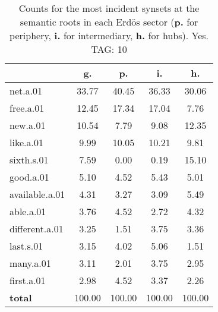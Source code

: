 \begin{table}[h!]
\begin{center}
\begin{tabular}{| l || c | c | c | c |}\hline
 & {\bf g.} & {\bf p.} & {\bf i.} & {\bf h.} \\\hline\hline
net.a.01 & 33.77  & 40.45  & 36.33  & 30.06 \\\hline
free.a.01 & 12.45  & 17.34  & 17.04  & 7.76 \\\hline
new.a.01 & 10.54  & 7.79  & 9.08  & 12.35 \\\hline
like.a.01 & 9.99  & 10.05  & 10.21  & 9.81 \\\hline
sixth.s.01 & 7.59  & 0.00  & 0.19  & 15.10 \\\hline
good.a.01 & 5.10  & 4.52  & 5.43  & 5.01 \\\hline
available.a.01 & 4.31  & 3.27  & 3.09  & 5.49 \\\hline
able.a.01 & 3.76  & 4.52  & 2.72  & 4.32 \\\hline
different.a.01 & 3.25  & 1.51  & 3.75  & 3.36 \\\hline
last.s.01 & 3.15  & 4.02  & 5.06  & 1.51 \\\hline
many.a.01 & 3.11  & 2.01  & 3.75  & 2.95 \\\hline
first.a.01 & 2.98  & 4.52  & 3.37  & 2.26 \\\hline\hline
{{\bf total}} & 100.00  & 100.00  & 100.00  & 100.00 \\\hline
\end{tabular}
\caption{Counts for the most incident synsets at the semantic roots in each Erd\"os sector ({\bf p.} for periphery, {\bf i.} for intermediary, {\bf h.} for hubs). Yes. TAG: 10}
\end{center}
\end{table}